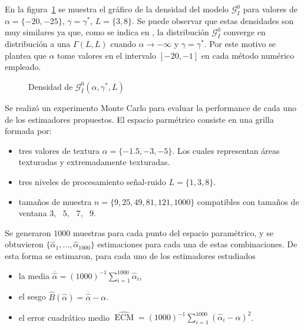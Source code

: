 
En la figura~\ref{densidades} se muestra el gráfico de la densidad del modelo $\mathcal{G}_I^0$ para valores de $\alpha=\{-20,-25\}$, $\gamma=\gamma^*$, $L=\{3,8\}$. Se puede observar que estas densidades son muy similares ya que, como se indica en \citet{Frery99}, la distribución $\mathcal{G}_I^0$ converge en distribución a una $\Gamma(L,L)$ cuando $\alpha \longrightarrow -\infty$ y $\gamma=\gamma^*$. Por este motivo se plantea que $\alpha$ tome valores en el intervalo $[-20,-1]$ en cada método numérico empleado. 

\begin{figure}[H]
	\centering
	\caption{\label{densidades}\small Densidad de $\mathcal{G}_I^0(\alpha,\gamma^*,L)$}
\end{figure}


Se realizó un experimento Monte Carlo para evaluar la performance de cada uno de los estimadores propuestos. El espacio parmétrico consiste en una grilla formada por:
\begin{itemize}
	\item tres valores de textura $\alpha=\{-1.5,-3,-5\}$. Los cuales representan áreas texturadas y extremadamente texturadas.
	\item tres niveles de procesamiento señal-ruido $L=\{1,3,8\}$.
	\item tamaños de muestra $n=\{9,25,49,81,121,1000\}$ compatibles con tamaños de ventana $3,\text{ }5,\text{ }7,\text{ }9$.
\end{itemize}

Se generaron $1000$ muestras para cada punto del espacio paramétrico, y se obtuvieron $\{\widehat{\alpha}_1, \dots, \widehat{\alpha}_{1000}\}$ estimaciones para cada una de estas combinaciones. De esta forma se estimaron, para cada uno de los estimadores estudiados
\begin{itemize}
	\label{ExperimentoMontecarlo}
	\item la media $\overline{\widehat{\alpha}}=(1000)^{-1}{\sum_{i=1}^{1000}{\widehat{\alpha}_i}}$,
	\item el sesgo  $\widehat{B}(\widehat\alpha) = \overline{\widehat\alpha}- \alpha$.
	 \item el error cuadrático medio $\widehat{\operatorname{ECM}}=({1000})^{-1}{\sum_{i=1}^{1000}{(\widehat{\alpha}_i-\alpha)^2}}$.
\end{itemize}
  
